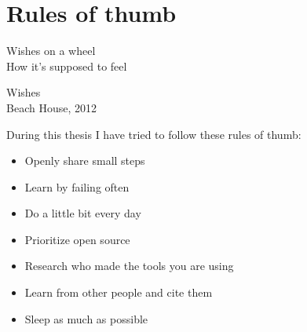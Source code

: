 \chapter{Rules of thumb}

\epigraph{Wishes on a wheel \\ How it's supposed to feel}{Wishes \\ Beach House, 2012}

During this thesis I have tried to follow these rules of thumb:

\begin{itemize}
  \item Openly share small steps
  \item Learn by failing often
  \item Do a little bit every day
  \item Prioritize open source
  \item Research who made the tools you are using
  \item Learn from other people and cite them
  \item Sleep as much as possible
\end{itemize}

